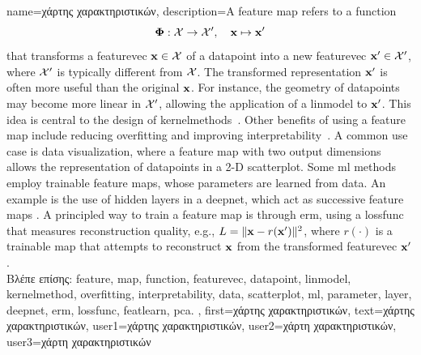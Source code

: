 {name={\foreignlanguage{greek}{χάρτης χαρακτηριστικών}}, 
	description={A \gls{feature} \gls{map} refers to a \gls{function} 
		$$
		{\bf \Phi}: \mathcal{X} \rightarrow \mathcal{X}', \quad {\bf x} \mapsto {\bf x}'
		$$
		that transforms a \gls{featurevec} ${\bf x} \in \mathcal{X}$ of 
 		a \gls{datapoint} into a new \gls{featurevec} ${\bf x}' \in \mathcal{X}'$, 
 		where $\mathcal{X}'$ is typically different from $\mathcal{X}$.
 		The transformed representation ${\bf x}'$ is often more useful than the original 
 		${\bf x}$. For instance, the geometry of \gls{datapoint}s may become more linear 
 		in $\mathcal{X}'$, allowing the application of a \gls{linmodel} to ${\bf x}'$. 
 		This idea is central to the design of \gls{kernelmethod}s~\cite{LearningKernelsBook}.
 		Other benefits of using a \gls{feature} \gls{map} include reducing \gls{overfitting} and 
 		improving \gls{interpretability}~\cite{Ribeiro2016}. A common use case is \gls{data} 
 		visualization, where a \gls{feature} \gls{map} with two output dimensions allows the representation 
 		of \gls{datapoint}s in a 2-D \gls{scatterplot}. Some \gls{ml} methods employ trainable 
 		\gls{feature} \gls{map}s, whose \gls{parameter}s are learned from \gls{data}. An example is 
 		the use of hidden \gls{layer}s in a \gls{deepnet}, which act as successive \gls{feature} \gls{map}s 
 		\cite{MallatUnderstandingDeepLearning}. A principled way to train a \gls{feature} \gls{map}  
 		is through \gls{erm}, using a \gls{lossfunc} that measures reconstruction quality, 
 		e.g., $L = \|{\bf x} - r({\bf x}')\|^2$, where $r(\cdot)$ is a trainable
 		\gls{map} that attempts to reconstruct ${\bf x}$ from the transformed \gls{featurevec} ${\bf x}'$. \\
		\foreignlanguage{greek}{Βλέπε επίσης:} \gls{feature}, \gls{map}, \gls{function}, \gls{featurevec}, \gls{datapoint}, \gls{linmodel}, 
		\gls{kernelmethod}, \gls{overfitting}, \gls{interpretability}, \gls{data}, \gls{scatterplot}, \gls{ml}, \gls{parameter}, \gls{layer}, 
		\gls{deepnet}, \gls{erm}, \gls{lossfunc}, \gls{featlearn}, \gls{pca}. },
	first={\foreignlanguage{greek}{χάρτης χαρακτηριστικών}},
	text={\foreignlanguage{greek}{χάρτης χαρακτηριστικών}},
	user1={\foreignlanguage{greek}{χάρτης χαρακτηριστικών}}, %
  	user2={\foreignlanguage{greek}{χάρτη χαρακτηριστικών}}, %
	user3={\foreignlanguage{greek}{χάρτη χαρακτηριστικών}} %
}

